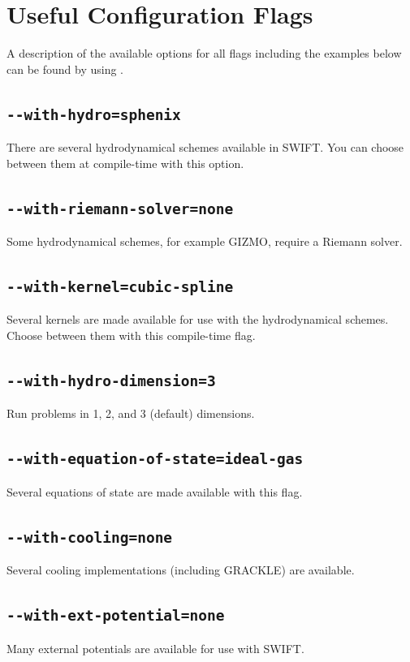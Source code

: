 \section{Useful Configuration Flags}

A description of the available options for all flags including the examples
below can be found by using
.

\subsection{\texttt{-{}-with-hydro=sphenix}}

There are several hydrodynamical schemes available in SWIFT. You can choose
between them at compile-time with this option.

\subsection{\texttt{-{}-with-riemann-solver=none}}
Some hydrodynamical schemes, for example GIZMO, require a Riemann solver.

\subsection{\texttt{-{}-with-kernel=cubic-spline}}
Several kernels are made available for use with the hydrodynamical schemes.
Choose between them with this compile-time flag.

\subsection{\texttt{-{}-with-hydro-dimension=3}}
Run problems in 1, 2, and 3 (default) dimensions.

\subsection{\texttt{-{}-with-equation-of-state=ideal-gas}}
Several equations of state are made available with this flag.

\subsection{\texttt{-{}-with-cooling=none}}
Several cooling implementations (including GRACKLE) are available.

\subsection{\texttt{-{}-with-ext-potential=none}}
Many external potentials are available for use with SWIFT. 



